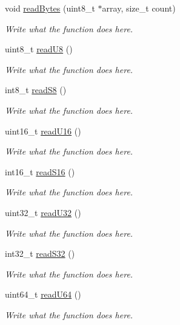 \begin{DoxyCompactItemize}
\item 
void \hyperlink{classReader_a9404d9cbfc0e979836fc8870195642f7}{read\+Bytes} (uint8\+\_\+t $\ast$array, size\+\_\+t count)
\begin{DoxyCompactList}\small\item\em Write what the function does here. \end{DoxyCompactList}\item 
uint8\+\_\+t \hyperlink{classReader_a32e2703dfc40dd59216b648a0cf7ce2c}{read\+U8} ()
\begin{DoxyCompactList}\small\item\em Write what the function does here. \end{DoxyCompactList}\item 
int8\+\_\+t \hyperlink{classReader_a40f5d85934f4a635d40b91211c055c07}{read\+S8} ()
\begin{DoxyCompactList}\small\item\em Write what the function does here. \end{DoxyCompactList}\item 
uint16\+\_\+t \hyperlink{classReader_afd87a9f4420fdf4d6bd5d311c745df92}{read\+U16} ()
\begin{DoxyCompactList}\small\item\em Write what the function does here. \end{DoxyCompactList}\item 
int16\+\_\+t \hyperlink{classReader_a4039d5151950e3522a3f0bd0f8f4ebdf}{read\+S16} ()
\begin{DoxyCompactList}\small\item\em Write what the function does here. \end{DoxyCompactList}\item 
uint32\+\_\+t \hyperlink{classReader_a04653238ccdff919d98262ad99672a33}{read\+U32} ()
\begin{DoxyCompactList}\small\item\em Write what the function does here. \end{DoxyCompactList}\item 
int32\+\_\+t \hyperlink{classReader_a310529f0c2100a14b0c36abef05b9e6c}{read\+S32} ()
\begin{DoxyCompactList}\small\item\em Write what the function does here. \end{DoxyCompactList}\item 
uint64\+\_\+t \hyperlink{classReader_a43bfa733ba536d41771a56ac3e91b053}{read\+U64} ()
\begin{DoxyCompactList}\small\item\em Write what the function does here. \end{DoxyCompactList}\item 

\end{DoxyCompactItemize}
